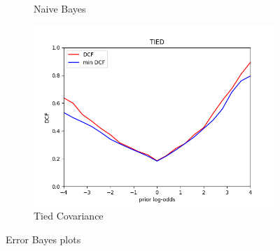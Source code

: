 \begin{figure}
\begin{subfigure}[b]{0.3\linewidth}
        \caption{Naive Bayes}
        \label{fig:dcfNB}
    \end{subfigure}
    \begin{subfigure}[b]{0.3\linewidth}
        \includegraphics[width=\linewidth]{Lab/07. Lab 07/Images/03. Tied}
        \caption{Tied Covariance}
        \label{fig:dcfTC}
    \end{subfigure}
    \caption{Error Bayes plots}
    \label{fig:dcfMVGNBTC}
\end{figure}